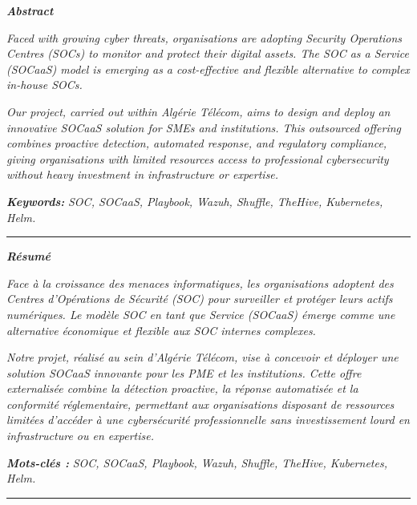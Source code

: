 \begin{center}
    {\Large \textbf{\textit{Abstract}}}
\end{center}

\vspace{0.5cm}

\begin{center}
    \textit{Faced with growing cyber threats, organisations are adopting Security Operations Centres (SOCs) to monitor and protect their digital assets. The SOC as a Service (SOCaaS) model is emerging as a cost-effective and flexible alternative to complex in-house SOCs.}
\end{center}

\begin{center}
    \textit{Our project, carried out within Algérie Télécom, aims to design and deploy an innovative SOCaaS solution for SMEs and institutions. This outsourced offering combines proactive detection, automated response, and regulatory compliance, giving organisations with limited resources access to professional cybersecurity without heavy investment in infrastructure or expertise.}
\end{center}

\vspace{0.3cm}

\begin{center}
    \textbf{\textit{Keywords:}} \textit{SOC, SOCaaS, Playbook, Wazuh, Shuffle, TheHive, Kubernetes, Helm.}
\end{center}

\vspace{1cm}
\hrule
\vspace{1cm}

\begin{center}
    {\Large \textbf{\textit{Résumé}}}
\end{center}

\vspace{0.5cm}

\begin{center}
    \textit{Face à la croissance des menaces informatiques, les organisations adoptent des Centres d'Opérations de Sécurité (SOC) pour surveiller et protéger leurs actifs numériques. Le modèle SOC en tant que Service (SOCaaS) émerge comme une alternative économique et flexible aux SOC internes complexes.}
\end{center}

\begin{center}
    \textit{Notre projet, réalisé au sein d'Algérie Télécom, vise à concevoir et déployer une solution SOCaaS innovante pour les PME et les institutions. Cette offre externalisée combine la détection proactive, la réponse automatisée et la conformité réglementaire, permettant aux organisations disposant de ressources limitées d'accéder à une cybersécurité professionnelle sans investissement lourd en infrastructure ou en expertise.}
\end{center}

\vspace{0.3cm}

\begin{center}
    \textbf{\textit{Mots-clés :}} \textit{SOC, SOCaaS, Playbook, Wazuh, Shuffle, TheHive, Kubernetes, Helm.}
\end{center}

\vspace{1cm}
\hrule
\vspace{1cm}